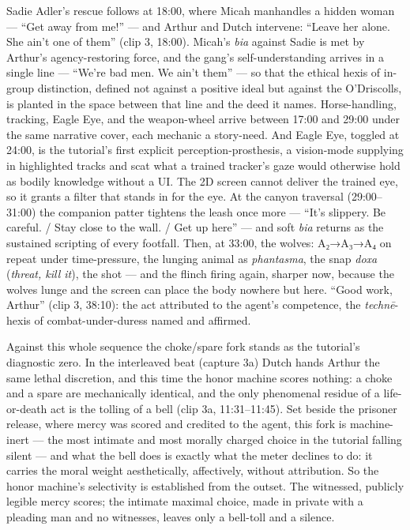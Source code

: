 \documentclass{article}
\begin{document}
Sadie Adler's rescue follows at 18:00, where Micah manhandles a hidden woman — ``Get away from me!'' — and Arthur and Dutch intervene: ``Leave her alone. She ain't one of them'' (clip 3, 18:00). Micah's \textit{bia} against Sadie is met by Arthur's agency-restoring force, and the gang's self-understanding arrives in a single line — ``We're bad men. We ain't them'' — so that the ethical hexis of in-group distinction, defined not against a positive ideal but against the O'Driscolls, is planted in the space between that line and the deed it names. Horse-handling, tracking, Eagle Eye, and the weapon-wheel arrive between 17:00 and 29:00 under the same narrative cover, each mechanic a story-need. And Eagle Eye, toggled at 24:00, is the tutorial's first explicit perception-prosthesis, a vision-mode supplying in highlighted tracks and scat what a trained tracker's gaze would otherwise hold as bodily knowledge without a UI. The 2D screen cannot deliver the trained eye, so it grants a filter that stands in for the eye. At the canyon traversal (29:00–31:00) the companion patter tightens the leash once more — ``It's slippery. Be careful. / Stay close to the wall. / Get up here'' — and soft \textit{bia} returns as the sustained scripting of every footfall. Then, at 33:00, the wolves: A₂→A₃→A₄ on repeat under time-pressure, the lunging animal as \textit{phantasma}, the snap \textit{doxa} (\textit{threat, kill it}), the shot — and the flinch firing again, sharper now, because the wolves lunge and the screen can place the body nowhere but here. ``Good work, Arthur'' (clip 3, 38:10): the act attributed to the agent's competence, the \textit{technē}-hexis of combat-under-duress named and affirmed.

Against this whole sequence the choke/spare fork stands as the tutorial's diagnostic zero. In the interleaved beat (capture 3a) Dutch hands Arthur the same lethal discretion, and this time the honor machine scores nothing: a choke and a spare are mechanically identical, and the only phenomenal residue of a life-or-death act is the tolling of a bell (clip 3a, 11:31–11:45). Set beside the prisoner release, where mercy was scored and credited to the agent, this fork is machine-inert — the most intimate and most morally charged choice in the tutorial falling silent — and what the bell does is exactly what the meter declines to do: it carries the moral weight aesthetically, affectively, without attribution. So the honor machine's selectivity is established from the outset. The witnessed, publicly legible mercy scores; the intimate maximal choice, made in private with a pleading man and no witnesses, leaves only a bell-toll and a silence.
\end{document}
